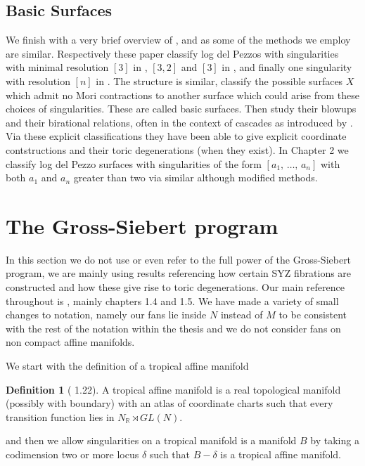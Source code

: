 \documentclass[12pt,a4paper]{book}      %
\theoremstyle{definition}
\newtheorem{dfn}[thm]{Definition}
\newcommand{\mb}[1]{\mathbb{#1}}
\begin{document}
\subsection{Basic Surfaces}
We finish with a very brief overview of \cite{CH}, \cite{Cuzz} and \cite{CP} as some of the methods we employ are similar. Respectively these paper classify log del Pezzos with singularities with minimal resolution $[3]$ in \cite{CH}, $[3,2]$ and $[3]$ in \cite{Cuzz}, and finally one singularity with resolution $[n]$ in \cite{CP}. The structure is similar, classify the possible surfaces $X$ which admit no Mori contractions to another surface which could arise from these choices of singularities. These are called basic surfaces. Then study their blowups and their birational relations, often in the context of cascades as introduced by \cite{MR2053462}. Via these explicit classifications they have been able to give explicit coordinate contstructions and their toric degenerations (when they exist). In Chapter 2 we classify log del Pezzo surfaces with singularities of the form $[a_1, \, \dots ,   \, a_n]$ with both $a_1$ and $a_n$ greater than two via similar although modified methods.


\section{The Gross-Siebert program}\label{GrossSec}

In this section we do not use or even refer to the full power of the Gross-Siebert program, we are mainly using results referencing how certain SYZ fibrations are constructed and how these give rise to toric degenerations. Our main reference throughout is \cite{GrossBook}, mainly chapters 1.4 and 1.5. We have made a variety of small changes to notation, namely our fans lie inside $N$ instead of $M$ to be consistent with the rest of the notation within the thesis and we do not consider fans on non compact affine manifolds.

We start with the definition of a tropical affine manifold
\begin{dfn}[\cite{GrossBook} 1.22]
A tropical affine manifold is a real topological manifold (possibly with boundary) with an atlas of coordinate charts such that every transition function lies in $N_\mb{R} \rtimes GL(N)$.
\end{dfn}
and then we allow singularities on a tropical manifold is a manifold $B$ by taking a codimension two or more locus $\delta$ such that $B-\delta$ is a tropical affine manifold.
\end{document}
